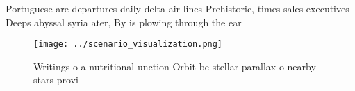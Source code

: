 \documentclass[a4paper]{article}
\begin{document}
Portuguese are departures daily delta air lines Prehistoric, times sales executives Deeps abyssal syria ater, By is plowing through the ear

\begin{figure}
\centering
\texttt{[image: ../scenario\_visualization.png]}
\caption{Writings o a nutritional unction Orbit be stellar parallax o nearby stars provi
}
\end{figure}
 
\end{document}
